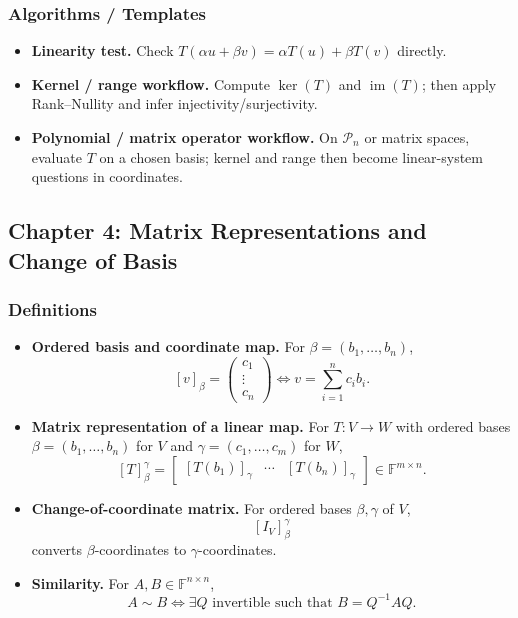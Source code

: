 \subsubsection*{Algorithms / Templates}

\begin{itemize}[leftmargin=*]
\item \textbf{Linearity test.} Check $T(\alpha u+\beta v)=\alpha T(u)+\beta T(v)$ directly.

\item \textbf{Kernel / range workflow.} Compute $\ker(T)$ and $\operatorname{im}(T)$; then apply Rank--Nullity and infer injectivity/surjectivity.

\item \textbf{Polynomial / matrix operator workflow.} On $\mathcal P_n$ or matrix spaces, evaluate $T$ on a chosen basis; kernel and range then become linear-system questions in coordinates.
\end{itemize}

\subsection*{Chapter 4: Matrix Representations and Change of Basis}

\subsubsection*{Definitions}

\begin{itemize}[leftmargin=*]
\item \textbf{Ordered basis and coordinate map.} For $\beta=(b_1,\dots,b_n)$,
\[
[v]_\beta=\begin{pmatrix}c_1\\ \vdots\\ c_n\end{pmatrix}
\iff
v=\sum_{i=1}^n c_i b_i.
\]

\item \textbf{Matrix representation of a linear map.} For $T:V\to W$ with ordered bases $\beta=(b_1,\dots,b_n)$ for $V$ and $\gamma=(c_1,\dots,c_m)$ for $W$,
\[
[T]^{\gamma}_{\beta}=
\begin{bmatrix}
[T(b_1)]_\gamma & \cdots & [T(b_n)]_\gamma
\end{bmatrix}\in\mathbb F^{m\times n}.
\]

\item \textbf{Change-of-coordinate matrix.} For ordered bases $\beta,\gamma$ of $V$,
\[
[I_V]^{\gamma}_{\beta}
\]
converts $\beta$-coordinates to $\gamma$-coordinates.

\item \textbf{Similarity.} For $A,B\in\mathbb F^{n\times n}$,
\[
A\sim B \iff \exists Q\text{ invertible such that }B=Q^{-1}AQ.
\]
\end{itemize}

